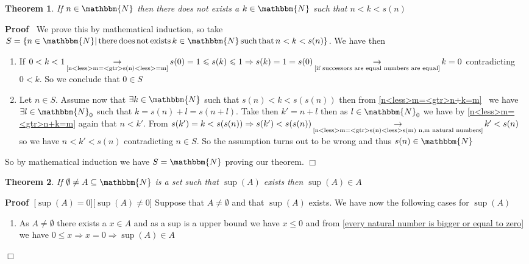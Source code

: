 \documentclass{book}
\newcommand{\Rightarrowlim}{\mathop{\rightarrow}\limits}
\newcommand{\nobracket}{}
\newcommand{\tmop}[1]{\ensuremath{\operatorname{#1}}}
\newcommand{\upl}{+}
\newenvironment{proof}{\noindent\textbf{Proof\ }}{\hspace*{\fill}$\Box$\medskip}
\newtheorem{theorem}{Theorem}
\begin{document}
{{\begin{theorem}
  \label{n<less>s(n)=<gtr>no natural number between n and s(n)}If $n \in
  \mathbbm{N}$ then there does not exists a $k \in \mathbbm{N}$ such that $n <
  k < s (n)$
\end{theorem}

\begin{proof}
  We prove this by mathematical induction, so take $S = \{ n \in \mathbbm{N} |
  \tmop{there} \tmop{does} \tmop{not} \tmop{exists} k \in \mathbbm{N}
  \tmop{such} \tmop{that} n < k < s (n) \nobracket \}$. We have then
  \begin{enumerate}
    \item If $0 < k < 1
    \Rightarrowlim_{\text{\ref{n<less>m=<gtr>s(n)<less>=m}}\text{}} s (0) = 1
    \leqslant s (k) \leqslant 1 \Rightarrow s (k) = 1 = s (0)
    \Rightarrowlim_{\text{\ref{if successors are equal numbers are equal}}} k
    = 0$ contradicting $0 < k$. So we conclude that $0 \in S$
    
    \item Let $n \in S$. Assume now that $\exists k \in \mathbbm{N}$ such that
    $s (n) < k < s (s (n))$ then from \ref{n<less>m=<gtr>n+k=m} \ we have
    $\exists l \in \mathbbm{N}_0$ such that $k = s (n) \upl l = s (n \upl l)$.
    Take then $k' = n \upl l$ then as $l \in \mathbbm{N}_0$ we have by
    \ref{n<less>m=<gtr>n+k=m} again that $n < k'$. From $s (k') = k < s (s
    (n)) \Rightarrow s (k') < s (s (n))
    \Rightarrowlim_{\text{\ref{n<less>m=<gtr>s(n)<less>s(m) n,m natural
    numbers}}} k' < s (n)$ so we have $n < k' < s (n)$ contradicting $n \in
    S$. So the assumption turns out to be wrong and thus $s (n) \in
    \mathbbm{N}$
  \end{enumerate}
  So by mathematical induction we have $S =\mathbbm{N}$ proving our theorem.
\end{proof}

\begin{theorem}
  \label{sup(A) is element of A in N}If $\emptyset \neq A \subseteq
  \mathbbm{N}$ is a set such that $\sup (A)$ exists then $\sup (A) \in A$
\end{theorem}

\begin{proof}[$\sup (A) = 0$][$\sup (A) \neq 0$]
  Suppose that $A \neq \emptyset$ and that $\sup (A)$ exists. We have now the
  following cases for $\sup (A)$
  \begin{enumerate}
    \item As $A \neq \emptyset$ there exists a $x \in A$ and as a sup is a
    upper bound we have $x \leqslant 0$ and from \ref{every natural number is
    bigger or equal to zero} we have $0 \leqslant x \Rightarrow x = 0
    \Rightarrow \sup (A) \in A$
    

\end{enumerate}
\end{proof}}}
\end{document}
